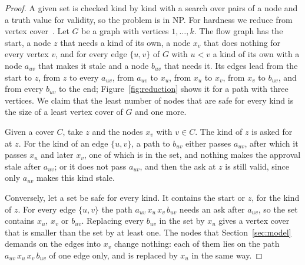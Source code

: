\documentclass[acmsmall,nonacm,screen]{acmart}
\begin{document}
\begin{proof}
A given set is checked kind by kind with a search over pairs of a node and a truth value
for validity, so the problem is in NP. For hardness we reduce from vertex
cover~\cite{karp1972}. Let $G$ be a graph with vertices $1, \ldots, k$. The flow graph has
the start, a node $z$ that needs a kind of its own, a node $x_v$ that does nothing for
every vertex $v$, and for every edge $\{u, v\}$ of $G$ with $u < v$ a kind of its own with
a node $a_{uv}$ that makes it stale and a node $b_{uv}$ that needs it. Its edges lead from
the start to $z$, from $z$ to every $a_{uv}$, from $a_{uv}$ to $x_u$, from $x_u$ to $x_v$,
from $x_v$ to $b_{uv}$, and from every $b_{uv}$ to the end; Figure~\ref{fig:reduction} shows
it for a path with three vertices. We claim that the least number of nodes that are safe
for every kind is the size of a least vertex cover of $G$ and one more.

Given a cover $C$, take $z$ and the nodes $x_v$ with $v \in C$. The kind of $z$ is asked for
at $z$. For the kind of an edge $\{u, v\}$, a path to $b_{uv}$ either passes $a_{uv}$, after
which it passes $x_u$ and later $x_v$, one of which is in the set, and nothing makes the
approval stale after $a_{uv}$; or it does not pass $a_{uv}$, and then the ask at $z$ is
still valid, since only $a_{uv}$ makes this kind stale.

Conversely, let a set be safe for every kind. It contains the start or $z$, for the kind of
$z$. For every edge $\{u, v\}$ the path $a_{uv}\, x_u\, x_v\, b_{uv}$ needs an ask after
$a_{uv}$, so the set contains $x_u$, $x_v$ or $b_{uv}$. Replacing every $b_{uv}$ in the set
by $x_u$ gives a vertex cover that is smaller than the set by at least one. The nodes that
Section~\ref{sec:model} demands on the edges into $x_v$ change nothing: each of them lies
on the path $a_{uv}\, x_u\, x_v\, b_{uv}$ of one edge only, and is replaced by $x_u$ in the
same way.
\end{proof}
\end{document}
